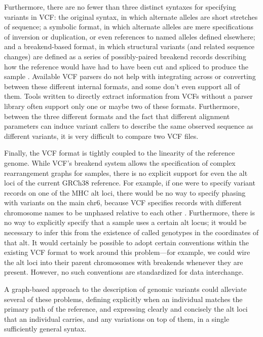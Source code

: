 \documentclass[11pt,proposal]{ucthesis}
\begin{document}
Furthermore, there are no fewer than three distinct syntaxes for specifying variants in VCF: the original syntax, in which alternate alleles are short stretches of sequence; a symbolic format, in which alternate alleles are mere specifications of inversion or duplication, or even references to named alleles defined elsewhere; and a breakend-based format, in which structural variants (and related sequence changes) are defined as a series of possibly-paired breakend records describing how the reference would have had to have been cut and spliced to produce the sample \cite{marshall2013variant}. Available VCF parsers do not help with integrating across or converting between these different internal formats, and some don't even support all of them. Tools written to directly extract information from VCFs without a parser library often support only one or maybe two of these formats. Furthermore, between the three different formats and the fact that different alignment parameters can induce variant callers to describe the same observed sequence as different variants, it is very difficult to compare two VCF files.

Finally, the VCF format is tightly coupled to the linearity of the reference genome. While VCF's breakend system allows the specification of complex rearrangement graphs for samples, there is no explicit support for even the alt loci of the current GRCh38 reference. For example, if one were to specify variant records on one of the MHC alt loci, there would be no way to specify phasing with variants on the main chr6, because VCF specifies records with different chromosome names to be unphased relative to each other \cite{marshall2013variant}. Furthermore, there is no way to explicitly specify that a sample uses a certain alt locus; it would be necessary to infer this from the existence of called genotypes in the coordinates of that alt. It would certainly be possible to adopt certain conventions within the existing VCF format to work around this problem---for example, we could wire the alt loci into their parent chromosomes with breakends whenever they are present. However, no such conventions are standardized for data interchange.

A graph-based approach to the description of genomic variants could alleviate several of these problems, defining explicitly when an individual matches the primary path of the reference, and expressing clearly and concisely the alt loci that an individual carries, and any variations on top of them, in a single sufficiently general syntax.
\end{document}
